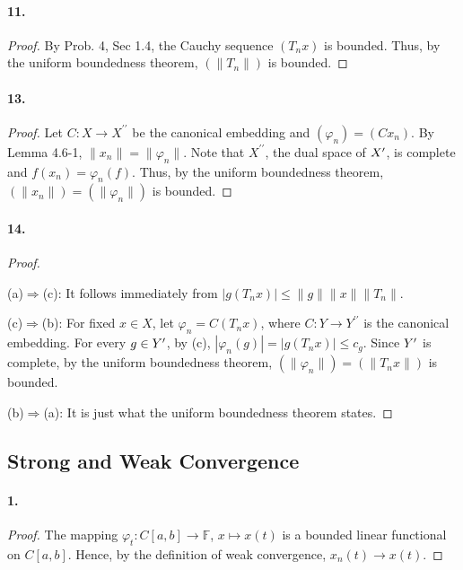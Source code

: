   \paragraph{11.}
  \begin{proof}
    By Prob. 4, Sec 1.4, the Cauchy sequence $(T_nx)$ is bounded. Thus, by the
    uniform boundedness theorem, $(\|T_n\|)$ is bounded.
  \end{proof}
  
  \paragraph{13.}
  \begin{proof}
    Let $C:X\to X^{\prime\prime}$ be the canonical embedding and $(\varphi_n)=
    (Cx_n)$. By Lemma 4.6-1, $\|x_n\|=\|\varphi_n\|$. Note that $X^{\prime
    \prime}$, the dual space of $X^\prime$, is complete and $f(x_n)=\varphi_n(f)$.
    Thus, by the uniform boundedness theorem, $(\|x_n\|)=(\|\varphi_n\|)$ is
    bounded.
  \end{proof}
  
  \paragraph{14.}
  \begin{proof}
    $\,$\par
    (a)$\Rightarrow$(c): It follows immediately from $|g(T_nx)|\le\|g\|\|x\|
    \|T_n\|$.\par
    (c)$\Rightarrow$(b): For fixed $x\in X$, let $\varphi_n=C(T_nx)$, where $C:
    Y\to Y^{\prime\prime}$ is the canonical embedding. For every $g\in Y^\prime$, by
    (c), $|\varphi_n(g)|=|g(T_nx)|\le c_g$. Since $Y^\prime$ is complete, by the
    uniform boundedness theorem, $(\|\varphi_n\|)=(\|T_nx\|)$ is bounded.\par
    (b)$\Rightarrow$(a): It is just what the uniform boundedness theorem states.
  \end{proof}
\subsection{Strong and Weak Convergence}
  \paragraph{1.}
  \begin{proof}
    The mapping $\varphi_t:C[a,b]\to\mathbb{F}$, $x\mapsto x(t)$ is a bounded
    linear functional on $C[a,b]$. Hence, by the definition of weak convergence,
    $x_n(t)\to x(t)$.
  \end{proof}
  
